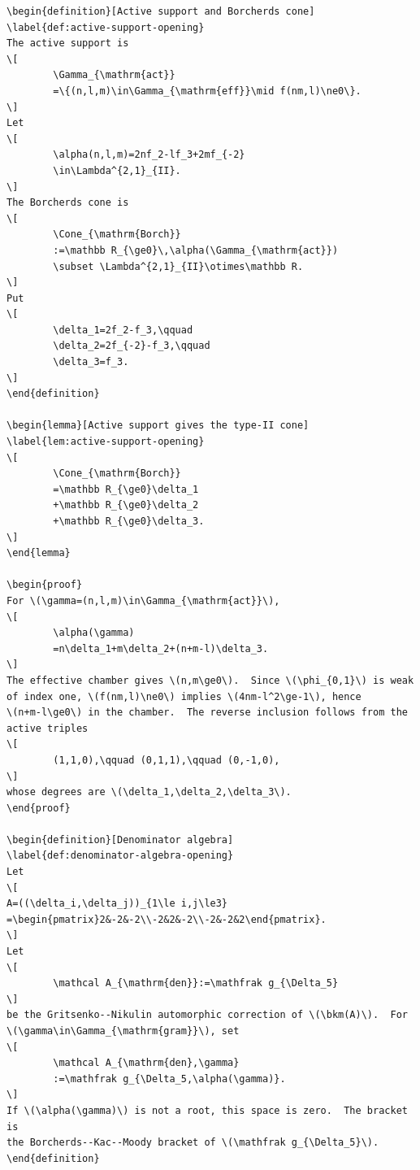 \begin{verbatim}
\begin{definition}[Active support and Borcherds cone]
\label{def:active-support-opening}
The active support is
\[
        \Gamma_{\mathrm{act}}
        =\{(n,l,m)\in\Gamma_{\mathrm{eff}}\mid f(nm,l)\ne0\}.
\]
Let
\[
        \alpha(n,l,m)=2nf_2-lf_3+2mf_{-2}
        \in\Lambda^{2,1}_{II}.
\]
The Borcherds cone is
\[
        \Cone_{\mathrm{Borch}}
        :=\mathbb R_{\ge0}\,\alpha(\Gamma_{\mathrm{act}})
        \subset \Lambda^{2,1}_{II}\otimes\mathbb R.
\]
Put
\[
        \delta_1=2f_2-f_3,\qquad
        \delta_2=2f_{-2}-f_3,\qquad
        \delta_3=f_3.
\]
\end{definition}

\begin{lemma}[Active support gives the type-II cone]
\label{lem:active-support-opening}
\[
        \Cone_{\mathrm{Borch}}
        =\mathbb R_{\ge0}\delta_1
        +\mathbb R_{\ge0}\delta_2
        +\mathbb R_{\ge0}\delta_3.
\]
\end{lemma}

\begin{proof}
For \(\gamma=(n,l,m)\in\Gamma_{\mathrm{act}}\),
\[
        \alpha(\gamma)
        =n\delta_1+m\delta_2+(n+m-l)\delta_3.
\]
The effective chamber gives \(n,m\ge0\).  Since \(\phi_{0,1}\) is weak
of index one, \(f(nm,l)\ne0\) implies \(4nm-l^2\ge-1\), hence
\(n+m-l\ge0\) in the chamber.  The reverse inclusion follows from the
active triples
\[
        (1,1,0),\qquad (0,1,1),\qquad (0,-1,0),
\]
whose degrees are \(\delta_1,\delta_2,\delta_3\).
\end{proof}

\begin{definition}[Denominator algebra]
\label{def:denominator-algebra-opening}
Let
\[
A=((\delta_i,\delta_j))_{1\le i,j\le3}
=\begin{pmatrix}2&-2&-2\\-2&2&-2\\-2&-2&2\end{pmatrix}.
\]
Let
\[
        \mathcal A_{\mathrm{den}}:=\mathfrak g_{\Delta_5}
\]
be the Gritsenko--Nikulin automorphic correction of \(\bkm(A)\).  For
\(\gamma\in\Gamma_{\mathrm{gram}}\), set
\[
        \mathcal A_{\mathrm{den},\gamma}
        :=\mathfrak g_{\Delta_5,\alpha(\gamma)}.
\]
If \(\alpha(\gamma)\) is not a root, this space is zero.  The bracket is
the Borcherds--Kac--Moody bracket of \(\mathfrak g_{\Delta_5}\).
\end{definition}


\end{verbatim}
